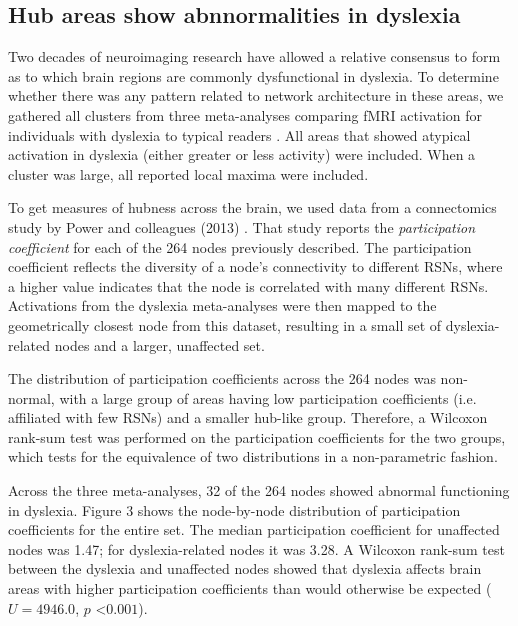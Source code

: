 \subsection{Hub areas show abnnormalities in dyslexia}
Two decades of neuroimaging research have allowed a relative consensus to form as to which brain regions are commonly dysfunctional in dyslexia. To determine whether there was any pattern related to network architecture in these areas, we gathered all clusters from three meta-analyses comparing fMRI activation for individuals with dyslexia to typical readers \cite{Maisog2008, Richlan2009, Paulesu2014}. All areas that showed atypical activation in dyslexia (either greater or less activity) were included. When a cluster was large, all reported local maxima were included. 

To get measures of hubness across the brain, we used data from a connectomics study by Power and colleagues (2013) \cite{Power2013}. That study reports the \textit{participation coefficient} for each of the 264 nodes previously described. The participation coefficient reflects the diversity of a node's connectivity to different RSNs, where a higher value indicates that the node is correlated with many different RSNs. Activations from the dyslexia meta-analyses were then mapped to the geometrically closest node from this dataset, resulting in a small set of dyslexia-related nodes and a larger, unaffected set.

The distribution of participation coefficients across the 264 nodes was non-normal, with a large group of areas having low participation coefficients (i.e. affiliated with few RSNs) and a smaller hub-like group. Therefore, a Wilcoxon rank-sum test was performed on the participation coefficients for the two groups, which tests for the equivalence of two distributions in a non-parametric fashion.

Across the three meta-analyses, 32 of the 264 nodes showed abnormal functioning in dyslexia. Figure 3 shows the node-by-node distribution of participation coefficients for the entire set. The median participation coefficient for unaffected nodes was 1.47; for dyslexia-related nodes it was 3.28. A Wilcoxon rank-sum test between the dyslexia and unaffected nodes showed that dyslexia affects brain areas with higher participation coefficients than would otherwise be expected ($U = 4946.0$, $p$ \textless $0.001$). 

